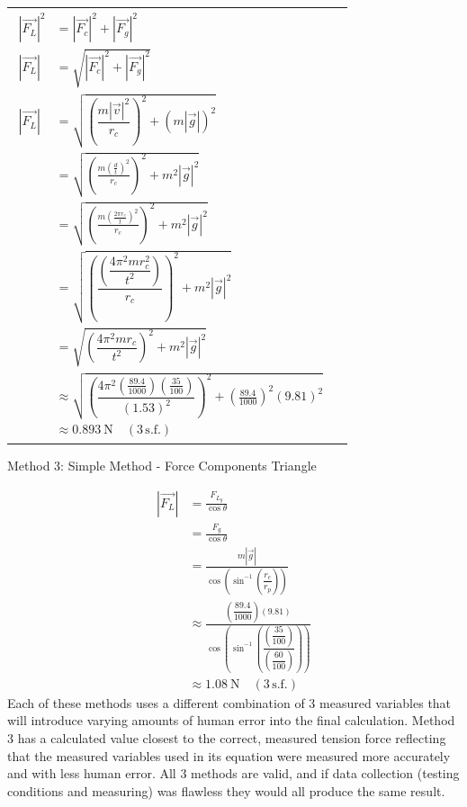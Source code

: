 \documentclass[11pt, a4paper]{article}
\begin{document}
\begin{table}[H]
\begin{tabularx}{\textwidth}{c|c}
{\begin{align}
				|\vec{F_L}|^2&=|\vec{F_c}|^2+|\vec{F_g}|^2\\
				|\vec{F_L}|&=\sqrt{\left|\vec{F_c}\right|^2+\left|\vec{F_g}\right|^2}\\
				|\vec{F_L}|&=\sqrt{\left(\dfrac{m|\vec{v}|^2}{r_c}\right)^2+(m|\vec{g}|)^2}\\
				&=\sqrt{\left(\frac{m\left(\frac{d}{t}\right)^2}{r_c}\right)^2+m^2|\vec{g}|^2}\\
				&=\sqrt{\left(\frac{m\left(\frac{2\pi r_c}{t}\right)^2}{r_c}\right)^2+m^2|\vec{g}|^2}\\
				&=\sqrt{\left(\dfrac{\left(\dfrac{4\pi^2 mr_c^2}{t^2}\right)}{r_c}\right)^2+m^2|\vec{g}|^2}\\
				&=\sqrt{\left(\dfrac{4\pi^2 mr_c}{t^2}\right)^2+m^2|\vec{g}|^2}\\
				&\approx\sqrt{\left(\dfrac{4\pi^2 \left(\frac{89.4}{1000}\right)\left(\frac{35}{100}\right)}{(1.53)^2}\right)^2+\left(\frac{89.4}{1000}\right)^2(9.81)^2}\\
				&\approx\SI{0.893}{\newton} \quad (3\, \text{s.f.})
			\end{align}
			}\\
		\end{tabularx}
	\end{table}
	\begin{center}
		Method 3: Simple Method - Force Components Triangle
	\end{center}
	\begin{align}
		|\vec{F_L}|&=\frac{F_{L_y}}{\cos \theta}\\
		&=\frac{F_g}{\cos \theta}\\
		&=\frac{m|\vec{g}|}{\cos \left(\sin^{-1}\left(\dfrac{r_c}{r_p}\right)\right)}\\
		&\approx\frac{\left(\dfrac{89.4}{1000}\right)(9.81)}{\cos \left(\sin^{-1}\left(\dfrac{\left(\dfrac{35}{100}\right)}{\left(\dfrac{60}{100}\right)}\right)\right)}\\
		&\approx\SI{1.08}{\newton} \quad (3\, \text{s.f.})
	\end{align}
	Each of these methods uses a different combination of 3 measured variables that will introduce varying amounts of human error into the final calculation. Method 3 has a calculated value closest to the correct, measured tension force reflecting that the measured variables used in its equation were measured more accurately and with less human error. All 3 methods are valid, and if data collection (testing conditions and measuring) was flawless they would all produce the same result.\\[\baselineskip]
\end{document}

